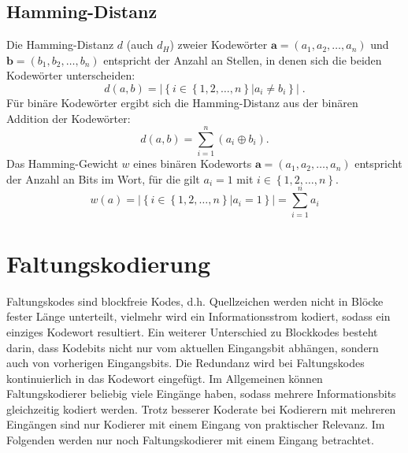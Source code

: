 \subsection{Hamming-Distanz}
\label{kapitel:grundlagen_hamming_distanz}
Die Hamming-Distanz $d$ (auch $d_{H}$) zweier Kodewörter $\mathbf{a}=\left( a_{1},a_{2},\dots ,a_{n}\right)$ und $\mathbf{b}=\left( b_{1},b_{2},\dots ,b_{n}\right)$ entspricht der Anzahl an Stellen, in denen sich die beiden Kodewörter unterscheiden:
\begin{equation}
d(a,b)=\vert\left\lbrace i \in \left\lbrace 1,2,\dots ,n \right\rbrace\vert a_{i}\neq b_{i}\right\rbrace\vert\; .
\end{equation}
Für binäre Kodewörter ergibt sich die Hamming-Distanz aus der binären Addition der Kodewörter:
\begin{equation}
d(a,b)=\sum_{i=1}^{n} \left( a_{i} \oplus b_{i}\right).
\end{equation}
Das Hamming-Gewicht $w$ eines binären Kodeworts $\mathbf{a}=\left( a_{1},a_{2},\dots ,a_{n}\right)$ entspricht der Anzahl an Bits im Wort, für die gilt $a_{i}=1$ mit $i \in \left\lbrace 1,2,\dots ,n \right\rbrace$.
\begin{equation}
w(a)=\vert\left\lbrace i \in \left\lbrace 1,2,\dots ,n \right\rbrace\vert a_{i}=1\right\rbrace\vert=\sum_{i=1}^{n} a_{i}
\end{equation}

\section{Faltungskodierung}
\label{kapitel:grundlagen_faltungskodierung}
Faltungskodes sind blockfreie Kodes, d.h. Quellzeichen werden nicht in Blöcke fester Länge unterteilt, vielmehr wird ein Informationsstrom kodiert, sodass ein einziges Kodewort resultiert. Ein weiterer Unterschied zu Blockkodes besteht darin, dass Kodebits nicht nur vom aktuellen Eingangsbit abhängen, sondern auch von vorherigen Eingangsbits. Die Redundanz wird bei Faltungskodes kontinuierlich in das Kodewort eingefügt. Im Allgemeinen können Faltungskodierer beliebig viele Eingänge haben, sodass mehrere Informationsbits gleichzeitig kodiert werden. Trotz besserer Koderate bei Kodierern mit mehreren Eingängen sind nur Kodierer mit einem Eingang von praktischer Relevanz. Im Folgenden werden nur noch Faltungskodierer mit einem Eingang betrachtet.

